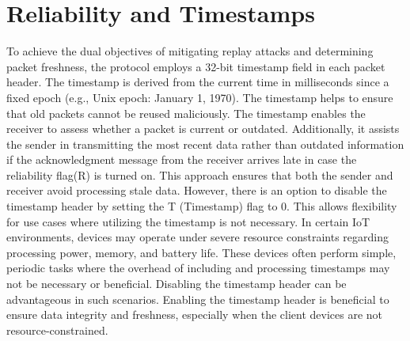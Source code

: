 \documentclass[lettersize,journal]{IEEEtran}
\begin{document}
\section{Reliability and Timestamps}
To achieve the dual objectives of mitigating replay attacks and determining packet freshness, the protocol employs a 32-bit timestamp field in each packet header. The timestamp is derived from the current time in milliseconds since a fixed epoch (e.g., Unix epoch: January 1, 1970).  The timestamp helps to ensure that old packets cannot be reused maliciously.  The timestamp enables the receiver to assess whether a packet is current or outdated. Additionally, it assists the sender in transmitting the most recent data rather than outdated information if the acknowledgment message from the receiver arrives late in case the reliability flag(R) is turned on. This approach ensures that both the sender and receiver avoid processing stale data. However, there is an option to disable the timestamp header by setting the T (Timestamp) flag to 0. This allows flexibility for use cases where utilizing the timestamp is not necessary. In certain IoT environments, devices may operate under severe resource constraints regarding processing power, memory, and battery life. These devices often perform simple, periodic tasks where the overhead of including and processing timestamps may not be necessary or beneficial. Disabling the timestamp header can be advantageous in such scenarios. Enabling the timestamp header is beneficial to ensure data integrity and freshness, especially when the client devices are not resource-constrained.
\end{document}
